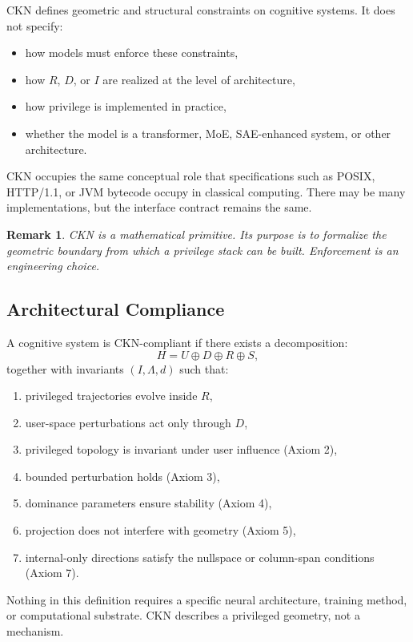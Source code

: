 \documentclass[11pt,a4paper]{article}
\newtheorem*{remark}{Remark}
\begin{document}
CKN defines geometric and structural constraints on cognitive systems. It does not specify:
\begin{itemize}
    \item how models must enforce these constraints,
    \item how $R$, $D$, or $I$ are realized at the level of architecture,
    \item how privilege is implemented in practice,
    \item whether the model is a transformer, MoE, SAE-enhanced system, or other architecture.
\end{itemize}

CKN occupies the same conceptual role that specifications such as POSIX, HTTP/1.1, or JVM bytecode occupy in classical computing. There may be many implementations, but the interface contract remains the same.

\begin{remark}
CKN is a mathematical primitive. Its purpose is to formalize the geometric boundary from which a privilege stack can be built. Enforcement is an engineering choice.
\end{remark}

\subsection{Architectural Compliance}

A cognitive system is CKN-compliant if there exists a decomposition:
\[
H = U \oplus D \oplus R \oplus S,
\]
together with invariants $(I, \Lambda, d)$ such that:
\begin{enumerate}
    \item privileged trajectories evolve inside $R$,
    \item user-space perturbations act only through $D$,
    \item privileged topology is invariant under user influence (Axiom 2),
    \item bounded perturbation holds (Axiom 3),
    \item dominance parameters ensure stability (Axiom 4),
    \item projection does not interfere with geometry (Axiom 5),
    \item internal-only directions satisfy the nullspace or column-span conditions (Axiom 7).
\end{enumerate}

Nothing in this definition requires a specific neural architecture, training method, or computational substrate. CKN describes a privileged geometry, not a mechanism.
\end{document}
